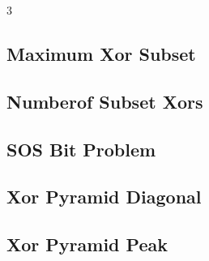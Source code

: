 \documentclass[8pt]{extarticle}
\begin{document}
\begin{multicols*}{3}
\subsection{Maximum Xor Subset}
\begin{caixaenunciado}

\end{caixaenunciado}
\vspace{0.3cm}


\subsection{Numberof Subset Xors}
\begin{caixaenunciado}

\end{caixaenunciado}
\vspace{0.3cm}


\subsection{SOS Bit Problem}
\begin{caixaenunciado}

\end{caixaenunciado}
\vspace{0.3cm}


\subsection{Xor Pyramid Diagonal}
\begin{caixaenunciado}

\end{caixaenunciado}
\vspace{0.3cm}


\subsection{Xor Pyramid Peak}
\begin{caixaenunciado}

\end{caixaenunciado}
\vspace{0.3cm}



\end{multicols*}
\end{document}
